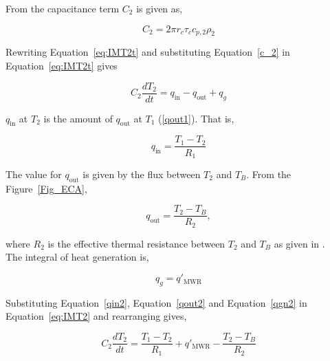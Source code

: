 From  the capacitance term $C_2$ is given as,

\begin{equation}
C_2 = 2\pi r_c\tau_c c_{p,2}\rho_2 \label{c_2}
\end{equation}

Rewriting Equation~\ref{eq:IMT2t} and substituting Equation~\ref{c_2} in
Equation~\ref{eq:IMT2t} gives

\begin{equation}
C_2 \frac{dT_2}{dt} = q_{\mathrm{in}}-q_{\mathrm{out}}+q_g \label{eq:IMT2}
\end{equation}

$q_{\text{in}}$ at $T_2$ is the amount of  $q_{\text{out}}$ at $T_1$
(\ref{qout1}). That is,

\begin{equation}
q_{\text{in}}= \frac{T_1-T_2}{R_1}\label{qin2}
\end{equation}

The value for $q_{\text{out}}$ is given by the flux between $T_2$ and $T_B$.
From the Figure~\ref{Fig_ECA},

\begin{equation}
q_{\text{out}}=\frac{T_2-T_B}{R_2}, \label{qout2}
\end{equation}

where $R_2$ is the effective thermal resistance between $T_2$ and $T_B$ as given
in .
\\
The integral of heat generation is,

\begin{equation}
q_{g}=q'_{\text{MWR}} \label{qgn2}
\end{equation}

Substituting Equation~\ref{qin2}, Equation~\ref{qout2} and Equation~\ref{qgn2}
in Equation~\ref{eq:IMT2}  and rearranging gives,

\begin{equation}
C_2 \frac{dT_2}{dt} =\frac{T_1 -T_2}{R_1}+q'_{\text{MWR}}-\frac{T_2-T_B}{R_2}
\end{equation}

